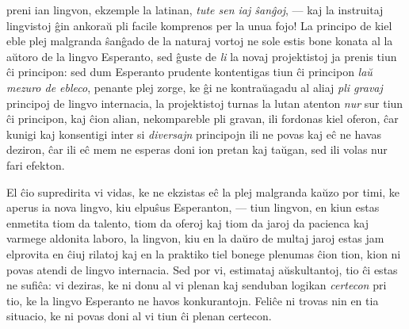 preni ian lingvon, ekzemple la latinan, {\sl tute sen iaj
\^san\^goj}, --- kaj la instruitaj lingvistoj \^gin ankora\u u pli
facile komprenos per la unua fojo! La principo de kiel eble plej
malgranda \^san\^gado de la naturaj vortoj ne sole estis bone konata
al la a\u utoro de la lingvo Esperanto, sed \^guste de {\sl li} la
novaj projektistoj ja prenis tiun \^ci principon: sed dum Esperanto
prudente kontentigas tiun \^ci principon {\sl la\u u mezuro de
ebleco}, penante plej zorge, ke \^gi ne kontra\u uagadu al aliaj
{\sl pli gravaj} principoj de lingvo internacia, la projektistoj
turnas la lutan atenton {\sl nur} sur tiun \^ci principon, kaj
\^cion alian, nekompareble pli gravan, ili fordonas kiel oferon,
\^car kunigi kaj konsentigi inter si {\sl diversajn} principojn ili
ne povas kaj e\^c ne havas deziron, \^car ili e\^c mem ne esperas
doni ion pretan kaj ta\u ugan, sed ili volas nur fari efekton.

   El \^cio supredirita vi vidas, ke ne ekzistas e\^c la plej malgranda
ka\u uzo por timi, ke aperus ia nova lingvo, kiu elpu\^sus
Esperanton, --- tiun lingvon, en kiun estas enmetita tiom da
talento, tiom da oferoj kaj tiom da jaroj da pacienca kaj varmege
aldonita laboro, la lingvon, kiu en la da\u uro de multaj jaroj
estas jam elprovita en \^ciuj rilatoj kaj en la praktiko tiel bonege
plenumas \^cion tion, kion ni povas atendi de lingvo internacia. Sed
por vi, estimataj a\u uskultantoj, tio \^ci estas ne sufi\^ca: vi
deziras, ke ni donu al vi plenan kaj senduban logikan {\sl certecon}
pri tio, ke la lingvo Esperanto ne havos konkurantojn. Feli\^ce ni
trovas nin en tia situacio, ke ni povas doni al vi tiun \^ci plenan
certecon.

